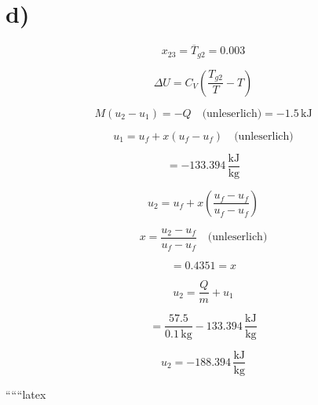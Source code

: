 

\section*{d)}

\[
x_{23} = \overline{T}_{g2} = 0.003
\]


\[
\Delta U = C_V \left( \frac{T_{g2}}{T} - T \right)
\]

\[
M (u_2 - u_1) = -Q \quad \text{(unleserlich)} = -1.5 \, \text{kJ}
\]

\[
u_1 = u_f + x (u_f - u_f) \quad \text{(unleserlich)}
\]

\[
= -133.394 \, \frac{\text{kJ}}{\text{kg}}
\]

\[
u_2 = u_f + x \left( \frac{u_f - u_f}{u_f - u_f} \right)
\]

\[
x = \frac{u_2 - u_f}{u_f - u_f} \quad \text{(unleserlich)}
\]

\[
= 0.4351 = x
\]

\[
u_2 = \frac{Q}{m} + u_1
\]

\[
= \frac{57.5}{0.1 \, \text{kg}} - 133.394 \, \frac{\text{kJ}}{\text{kg}}
\]

\[
u_2 = -188.394 \, \frac{\text{kJ}}{\text{kg}}
\]

``````latex